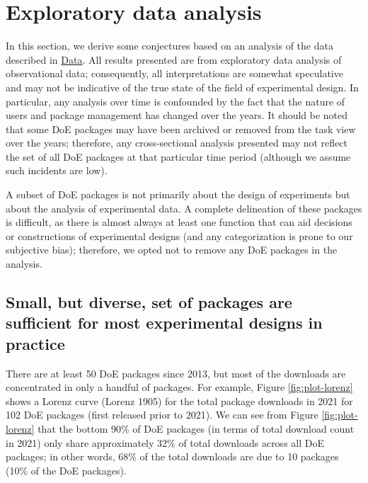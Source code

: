 \hypertarget{eda}{%
\section{Exploratory data analysis}\label{eda}}

In this section, we derive some conjectures based on an analysis of the data described in \hyperref[data]{Data}. All results presented are from exploratory data analysis of observational data; consequently, all interpretations are somewhat speculative and may not be indicative of the true state of the field of experimental design. In particular, any analysis over time is confounded by the fact that the nature of users and package management has changed over the years. It should be noted that some DoE packages may have been archived or removed from the task view over the years; therefore, any cross-sectional analysis presented may not reflect the set of all DoE packages at that particular time period (although we assume such incidents are low).

A subset of DoE packages is not primarily about the design of experiments but about the analysis of experimental data. A complete delineation of these packages is difficult, as there is almost always at least one function that can aid decisions or constructions of experimental designs (and any categorization is prone to our subjective bias); therefore, we opted not to remove any DoE packages in the analysis.

\hypertarget{small-but-diverse-set-of-packages-are-sufficient-for-most-experimental-designs-in-practice}{%
\subsection{Small, but diverse, set of packages are sufficient for most experimental designs in practice}\label{small-but-diverse-set-of-packages-are-sufficient-for-most-experimental-designs-in-practice}}

There are at least 50 DoE packages since 2013, but most of the downloads are concentrated in only a handful of packages. For example, Figure \ref{fig:plot-lorenz} shows a Lorenz curve (Lorenz 1905) for the total package downloads in 2021 for 102 DoE packages (first released prior to 2021). We can see from Figure \ref{fig:plot-lorenz} that the bottom 90\% of DoE packages (in terms of total download count in 2021) only share approximately 32\% of total downloads across all DoE packages; in other words, 68\% of the total downloads are due to 10 packages (10\% of the DoE packages).


